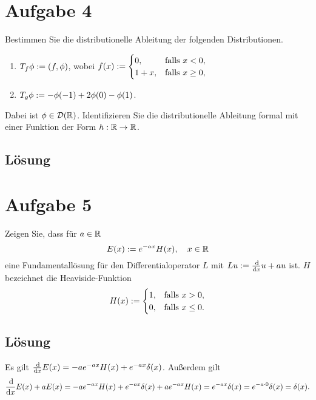 \documentclass{exercise}
\begin{document}
    \section*{Aufgabe 4}
    
    \begin{problem}
        Bestimmen Sie die distributionelle Ableitung der folgenden Distributionen.
        \begin{enumerate}
            \item \(T_f \phi := \parentheses*{f, \phi}\), wobei \(f\parentheses*{x} := \begin{cases}
                0, & \text{falls }x < 0,\\
                1 + x, & \text{falls }x \ge 0,
            \end{cases}\)
            \item \(T_g \phi := -\phi\parentheses*{-1} + 2\phi\parentheses*{0} - \phi\parentheses*{1}\).
        \end{enumerate}
        Dabei ist \(\phi \in \mathcal{D}\parentheses*{\R}\).
        Identifizieren Sie die distributionelle Ableitung formal mit einer Funktion der Form \(h: \R \to \R\).
    \end{problem}
    
    \subsection*{Lösung}


    \section*{Aufgabe 5}
    
    \begin{problem}
        Zeigen Sie, dass für \(a \in \R\)
        \[
            E\parentheses*{x} := e^{-ax}H\parentheses*{x}, \quad x \in \R
        \]
        eine Fundamentallösung für den Differentialoperator \(L\) mit \(Lu := \frac{\d}{\d x}u + au\) ist.
        \(H\) bezeichnet die Heaviside-Funktion
        \[
            H\parentheses*{x} := \begin{cases}
                1, & \text{falls }x > 0,\\
                0, & \text{falls }x \le 0.
            \end{cases}
        \]
    \end{problem}
    
    \subsection*{Lösung}
    Es gilt \(\frac{\d}{\d x}E\parentheses*{x} = -ae^{-ax}H\parentheses*{x} + e^{-ax}\delta\parentheses*{x}\).
    Außerdem gilt
    \[
        \frac{\d}{\d x}E\parentheses*{x} + aE\parentheses*{x} = -ae^{-ax}H\parentheses*{x} + e^{-ax}\delta\parentheses*{x} + ae^{-ax}H\parentheses*{x} = e^{-ax}\delta\parentheses*{x} = e^{-a \cdot 0}\delta\parentheses*{x} = \delta\parentheses*{x}.
    \]
\end{document}

